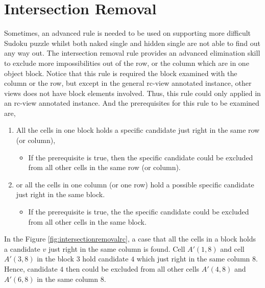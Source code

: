 \documentclass[11pt]{report}
\begin{document}
\section{Intersection Removal}
\label{sec:IntersectionRemoval}
Sometimes, an advanced rule is needed to be used on supporting more difficult Sudoku puzzle whilst both naked single and hidden single are not able to find out any way out. The intersection removal rule provides an advanced elimination skill to exclude more impossibilities out of the row, or the column which are in one object block. Notice that this rule is required the block examined with the column or the row, but except in the general rc-view annotated instance, other views does not have block elements involved. Thus, this rule could only applied in an rc-view annotated instance. And the prerequisites for this rule to be examined are, 
\begin{enumerate}
\item All the cells in one block holds a specific candidate just right in the same row (or column),
\begin{itemize}
\item If the prerequisite is true, then the specific candidate could be excluded from all other cells in the same row (or column). 
\end{itemize}
\item or all the cells in one column (or one row) hold a possible specific candidate just right in the same block.
\begin{itemize}
\item If the prerequisite is true, the the specific candidate could be excluded from all other cells in the same block. 
\end{itemize}
\end{enumerate}
In the Figure \ref{fig:intersectionremovalrc}, a case that all the cells in a block holds a candidate $v$ just right in the same column is found. Cell $A'(1,8)$ and cell $A'(3,8)$ in the block $3$ hold candidate $4$ which just right in the same column $8$. Hence, candidate $4$ then could be excluded from all other cells $A'(4,8)$ and $A'(6,8)$ in the same column $8$.
\end{document}
